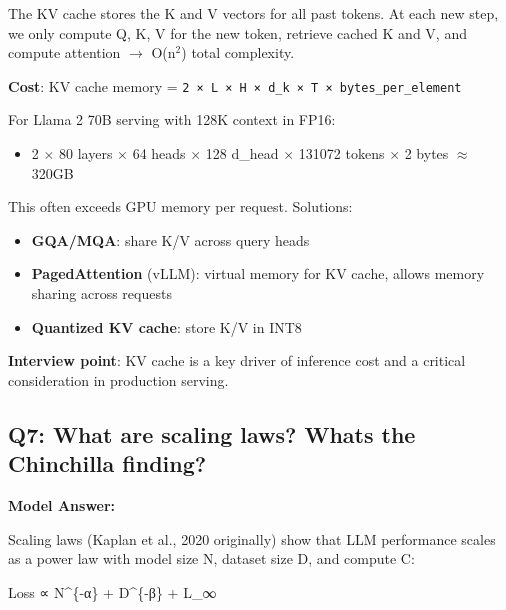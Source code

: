 \documentclass[11pt]{article}
\providecommand{\tightlist}{\setlength{\itemsep}{1pt}\setlength{\parskip}{0pt}}
\newenvironment{Shaded}{\begin{snugshade}}{\end{snugshade}}
\newcommand{\NormalTok}[1]{\textcolor[rgb]{0.81,0.81,0.76}{#1}}
\newcommand{\OperatorTok}[1]{\textcolor[rgb]{0.81,0.81,0.76}{#1}}
\begin{document}
The KV cache stores the K and V vectors for all past tokens. At each new step, we only compute Q, K, V for the new token, retrieve cached K and V, and compute attention \(\rightarrow\) O(n\(^2\)) total complexity.

\textbf{Cost}: KV cache memory = \texttt{2\ ×\ L\ ×\ H\ ×\ d\_k\ ×\ T\ ×\ bytes\_per\_element}

For Llama 2 70B serving with 128K context in FP16:

\begin{itemize}
\tightlist
\item
  2 \(\times\) 80 layers \(\times\) 64 heads \(\times\) 128 d\_head \(\times\) 131072 tokens \(\times\) 2 bytes \(\approx\) 320GB
\end{itemize}

This often exceeds GPU memory per request. Solutions:

\begin{itemize}
\tightlist
\item
  \textbf{GQA/MQA}: share K/V across query heads
\item
  \textbf{PagedAttention} (vLLM): virtual memory for KV cache, allows memory sharing across requests
\item
  \textbf{Quantized KV cache}: store K/V in INT8
\end{itemize}

\textbf{Interview point}: KV cache is a key driver of inference cost and a critical consideration in production serving.

\subsection{Q7: What are scaling laws? What\textquotesingle s the Chinchilla finding?}\label{q7-what-are-scaling-laws-whats-the-chinchilla-finding}

\textbf{Model Answer:}

Scaling laws (Kaplan et al., 2020 originally) show that LLM performance scales as a power law with model size N, dataset size D, and compute C:


\begin{Shaded}
\begin{Highlighting}[]
\NormalTok{Loss ∝ N}\OperatorTok{\^{}}\NormalTok{\{}\OperatorTok{{-}}\NormalTok{α\} }\OperatorTok{+}\NormalTok{ D}\OperatorTok{\^{}}\NormalTok{\{}\OperatorTok{{-}}\NormalTok{β\} }\OperatorTok{+}\NormalTok{ L\_∞}
\end{Highlighting}
\end{Shaded}
\end{document}
